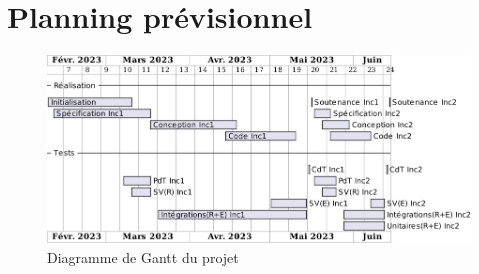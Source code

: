 
\section{Planning prévisionnel}
\label{sec:planning}

\begin{figure}[ht] 
    \centering
    \includegraphics[width=14cm]{schemas/gantt.png}
    \caption{Diagramme de Gantt du projet {\projet}}
\end{figure}
